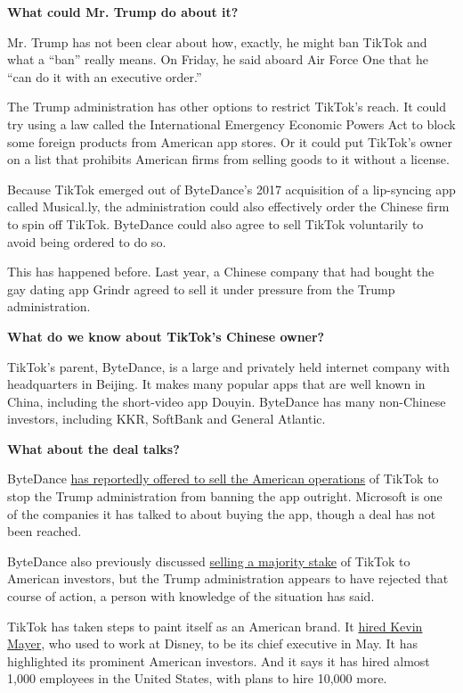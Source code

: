 \textbf{What could Mr. Trump do about it?}

Mr. Trump has not been clear about how, exactly, he might ban TikTok and
what a ``ban'' really means. On Friday, he said aboard Air Force One
that he ``can do it with an executive order.''

The Trump administration has other options to restrict TikTok's reach.
It could try using a law called the International Emergency Economic
Powers Act to block some foreign products from American app stores. Or
it could put TikTok's owner on a list that prohibits American firms from
selling goods to it without a license.

Because TikTok emerged out of ByteDance's 2017 acquisition of a
lip-syncing app called Musical.ly, the administration could also
effectively order the Chinese firm to spin off TikTok. ByteDance could
also agree to sell TikTok voluntarily to avoid being ordered to do so.

This has happened before. Last year, a Chinese company that had bought
the gay dating app Grindr agreed to sell it under pressure from the
Trump administration.

\textbf{What do we know about TikTok's Chinese owner?}

TikTok's parent, ByteDance, is a large and privately held internet
company with headquarters in Beijing. It makes many popular apps that
are well known in China, including the short-video app Douyin. ByteDance
has many non-Chinese investors, including KKR, SoftBank and General
Atlantic.

\textbf{What about the deal talks?}

ByteDance
\href{https://www.nytimes3xbfgragh.onion/2020/08/01/technology/tiktok-sale-trump-ban.html}{has
reportedly offered to sell the American operations} of TikTok to stop
the Trump administration from banning the app outright. Microsoft is one
of the companies it has talked to about buying the app, though a deal
has not been reached.

ByteDance also previously discussed
\href{https://www.nytimes3xbfgragh.onion/2020/07/23/business/dealbook/tiktok-bytedance-investors-trump.html?searchResultPosition=2}{selling
a majority stake} of TikTok to American investors, but the Trump
administration appears to have rejected that course of action, a person
with knowledge of the situation has said.

TikTok has taken steps to paint itself as an American brand. It
\href{https://www.nytimes3xbfgragh.onion/2020/05/18/business/media/tiktok-ceo-kevin-mayer.html}{hired
Kevin Mayer}, who used to work at Disney, to be its chief executive in
May. It has highlighted its prominent American investors. And it says it
has hired almost 1,000 employees in the United States, with plans to
hire 10,000 more.

